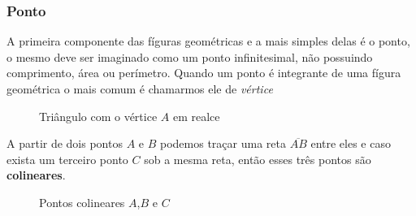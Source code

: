\begin{multicols*}{2}
    \subsubsection{Ponto}
    A primeira componente das fíguras geométricas e a mais simples delas é o ponto, o mesmo deve ser imaginado como um
    ponto infinitesimal, não possuindo comprimento, área ou perímetro. Quando um ponto é integrante de uma fígura
    geométrica o mais comum é chamarmos ele de \textit{vértice}
    \begin{figure}[H]
        \centering
        \caption{Triângulo com o vértice $A$ em realce }
    \end{figure}



    A partir de dois pontos $A$ e $B$ podemos traçar uma reta $\overline{AB}$ entre eles e caso exista um terceiro ponto $C$ sob a mesma reta,
    então esses três pontos são \textbf{colineares}.

    \begin{figure}[H]
        \centering
        \caption{Pontos colineares $A$,$B$ e $C$}
        \label{fig:reta_ab}
    \end{figure}


\end{multicols*}

